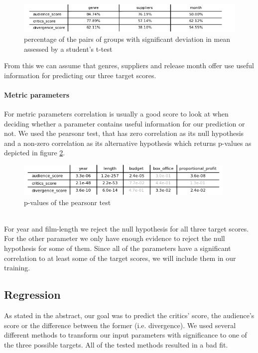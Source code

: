 \documentclass{article}
\begin{document}
    \noindent
    \begin{figure}[t]
        \centering
        \includegraphics[width=1\textwidth]{imgs/prozent.png}
        \caption{percentage of the pairs of groups with significant deviation in mean assessed by a student's t-test}
        \label{fig:hypo_rejection}
    \end{figure}
    From this we can assume that genres, suppliers and release month offer use useful information for predicting our three target scores.
    \paragraph{Metric parameters}
    For metric parameters correlation is usually a good score to look at when deciding whether a parameter contains useful information for our prediction or not. We used the pearsonr test, that has zero correlation as its null hypothesis and a non-zero correlation as its alternative hypothesis which returns p-values as depicted in figure \ref{fig:metric}.\\
    \noindent
    \begin{figure}[t]
        \centering
        \includegraphics[width=0.94\textwidth]{imgs/metric_p.png}
        \caption{p-values of the pearsonr test}
        \label{fig:metric}
    \end{figure}\\
    For year and film-length we reject the null hypothesis for all three target scores. For the other parameter we only have enough evidence to reject the null hypothesis for some of them. Since all of the parameters have a significant correlation to at least some of the target scores, we will include them in our training.
    
    
\subsection{Regression}
    As stated in the abstract, our goal was to predict the critics' score, the audience's score or the difference between the former (i.e. divergence).
    We used several different methods to transform our input parameters with significance to one of the three possible targets. All of the tested methods resulted in a bad fit.
\end{document}
